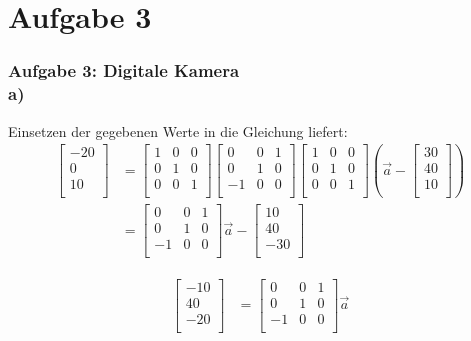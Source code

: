 \documentclass[accentcolor=tud9c,colorbacktitle,inverttitle,landscape,german,presentation,t]{tudbeamer}
\begin{document}
\section{Aufgabe 3}
	\begin{frame}
		\frametitle{Aufgabe 3: Digitale Kamera \\ a)}
		
		Einsetzen der gegebenen Werte in die Gleichung liefert:
		\begin{align*}
		\begin{bmatrix}
		-20 \\
		0 \\
		10 \\
		\end{bmatrix}
		&=
		\begin{bmatrix}
		1 & 0 & 0 \\
		0 & 1 & 0 \\
		0 & 0 & 1 \\
		\end{bmatrix}
		\begin{bmatrix}
		0  & 0 & 1 \\
		0  & 1 & 0 \\
		-1 & 0 & 0 \\
		\end{bmatrix}
		\begin{bmatrix}
		1 & 0 & 0 \\
		0 & 1 & 0 \\
		0 & 0 & 1 \\
		\end{bmatrix}
		\left(
		\vec{a} - 
		\begin{bmatrix}
		30 \\
		40 \\
		10 \\
		\end{bmatrix}
		\right)
		\\
		&=
		\begin{bmatrix}
		0  & 0 & 1 \\
		0  & 1 & 0 \\
		-1 & 0 & 0 \\
		\end{bmatrix}
		\vec{a}
		-
		\begin{bmatrix}
		10  \\
		40  \\
		-30 \\
		\end{bmatrix}
		\end{align*}
		
		
		
		\begin{align*}
		\begin{bmatrix}
		-10 \\
		40  \\
		-20 \\
		\end{bmatrix}
		&=
		\begin{bmatrix}
		0  & 0 & 1 \\
		0  & 1 & 0 \\
		-1 & 0 & 0 \\
		\end{bmatrix}
		\vec{a}
		\end{align*}		
	\end{frame}
\end{document}
